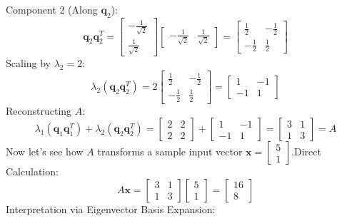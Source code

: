 \documentclass[DIV=20,oneside]{scrartcl}
\begin{document}
\begin{itemize}
	Component 2 (Along $\mathbf{q}_2$):$$\mathbf{q}_2 \mathbf{q}_2^T = \begin{bmatrix} -\frac{1}{\sqrt{2}} \\ \frac{1}{\sqrt{2}} \end{bmatrix} \begin{bmatrix} -\frac{1}{\sqrt{2}} & \frac{1}{\sqrt{2}} \end{bmatrix} = \begin{bmatrix} \frac{1}{2} & -\frac{1}{2} \\ -\frac{1}{2} & \frac{1}{2} \end{bmatrix}$$Scaling by $\lambda_2 = 2$:$$\lambda_2 (\mathbf{q}_2 \mathbf{q}_2^T) = 2 \begin{bmatrix} \frac{1}{2} & -\frac{1}{2} \\ -\frac{1}{2} & \frac{1}{2} \end{bmatrix} = \begin{bmatrix} 1 & -1 \\ -1 & 1 \end{bmatrix}$$
	Reconstructing $A$:$$\lambda_1 (\mathbf{q}_1 \mathbf{q}_1^T) + \lambda_2 (\mathbf{q}_2 \mathbf{q}_2^T) = \begin{bmatrix} 2 & 2 \\ 2 & 2 \end{bmatrix} + \begin{bmatrix} 1 & -1 \\ -1 & 1 \end{bmatrix} = \begin{bmatrix} 3 & 1 \\ 1 & 3 \end{bmatrix} = A$$
	Now let's see how $A$ transforms a sample input vector $\mathbf{x} = \begin{bmatrix} 5 \\ 1 \end{bmatrix}$.Direct Calculation:$$A\mathbf{x} = \begin{bmatrix} 3 & 1 \\ 1 & 3 \end{bmatrix} \begin{bmatrix} 5 \\ 1 \end{bmatrix} = \begin{bmatrix} 16 \\ 8 \end{bmatrix}$$
	Interpretation via Eigenvector Basis Expansion: \\

\end{itemize}
\end{document}
